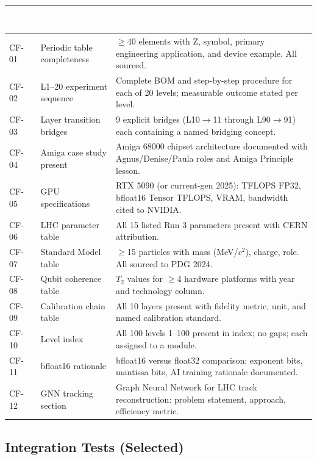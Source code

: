\documentclass[11pt,letterpaper]{article}
\newcommand{\tableheader}[1]{\textbf{\sffamily\textcolor{white}{#1}}}
\begin{document}
\begin{center}
\begin{tabularx}{\textwidth}{C{1.5cm}L{3.8cm}X}
\toprule
{}
\tableheader{Test ID} & \tableheader{Verifies} & \tableheader{Expected Outcome} \\
\midrule
CF-01 & Periodic table completeness & $\geq$40 elements with Z, symbol, primary engineering application, and device example. All sourced. \\
CF-02 & L1--20 experiment sequence & Complete BOM and step-by-step procedure for each of 20 levels; measurable outcome stated per level. \\
CF-03 & Layer transition bridges & 9 explicit bridges (L10$\rightarrow$11 through L90$\rightarrow$91) each containing a named bridging concept. \\
CF-04 & Amiga case study present & Amiga 68000 chipset architecture documented with Agnus/Denise/Paula roles and Amiga Principle lesson. \\
CF-05 & GPU specifications & RTX 5090 (or current-gen 2025): TFLOPS FP32, bfloat16 Tensor TFLOPS, VRAM, bandwidth cited to NVIDIA. \\
CF-06 & LHC parameter table & All 15 listed Run 3 parameters present with CERN attribution. \\
CF-07 & Standard Model table & $\geq$15 particles with mass (MeV/$c^2$), charge, role. All sourced to PDG 2024. \\
CF-08 & Qubit coherence table & $T_2$ values for $\geq$4 hardware platforms with year and technology column. \\
CF-09 & Calibration chain table & All 10 layers present with fidelity metric, unit, and named calibration standard. \\
CF-10 & Level index & All 100 levels 1--100 present in index; no gaps; each assigned to a module. \\
CF-11 & bfloat16 rationale & bfloat16 versus float32 comparison: exponent bits, mantissa bits, AI training rationale documented. \\
CF-12 & GNN tracking section & Graph Neural Network for LHC track reconstruction: problem statement, approach, efficiency metric. \\
\bottomrule
\end{tabularx}
\end{center}

\subsection{Integration Tests (Selected)}
\end{document}
